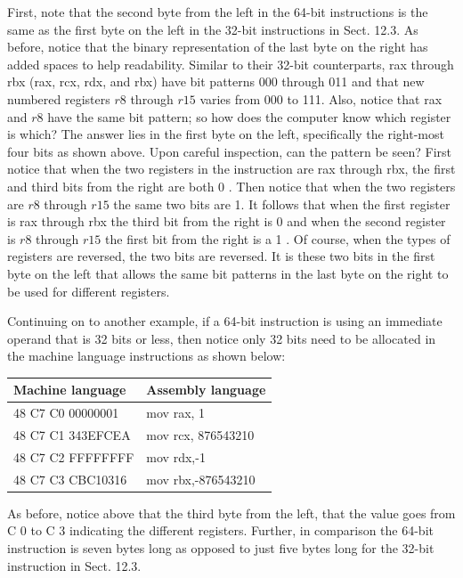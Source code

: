 \documentclass[10pt]{book}
\begin{document}
\begin{center}
\begin{center}
\begin{center}
\begin{center}
\begin{center}
First, note that the second byte from the left in the 64-bit instructions is the same as the first byte on the left in the 32-bit instructions in Sect. 12.3. As before, notice that the binary representation of the last byte on the right has added spaces to help readability. Similar to their 32-bit counterparts, rax through rbx (rax, rcx, rdx, and rbx) have bit patterns 000 through 011 and that new numbered registers $r 8$ through $r 15$ varies from 000 to 111. Also, notice that rax and $r 8$ have the same bit pattern; so how does the computer know which register is which? The answer lies in the first byte on the left, specifically the right-most four bits as shown above. Upon careful inspection, can the pattern be seen? First notice that when the two registers in the instruction are rax through rbx, the first and third bits from the right are both 0 . Then notice that when the two registers are $r 8$ through $r 15$ the same two bits are 1. It follows that when the first register is rax through rbx the third bit from the right is 0 and when the second register is $r 8$ through $r 15$ the first bit from the right is a 1 . Of course, when the types of registers are reversed, the two bits are reversed. It is these two bits in the first byte on the left that allows the same bit patterns in the last byte on the right to be used for different registers.

Continuing on to another example, if a 64-bit instruction is using an immediate operand that is 32 bits or less, then notice only 32 bits need to be allocated in the machine language instructions as shown below:

\begin{center}
\begin{tabular}{|l|l|}
\hline
Machine language & Assembly language \\
\hline
48 C7 C0 00000001 & mov rax, 1 \\
\hline
48 C7 C1 343EFCEA & mov rcx, 876543210 \\
\hline
48 C7 C2 FFFFFFFF & mov rdx,-1 \\
\hline
48 C7 C3 CBC10316 & mov rbx,-876543210 \\
\hline
\end{tabular}
\end{center}

As before, notice above that the third byte from the left, that the value goes from C 0 to C 3 indicating the different registers. Further, in comparison the 64-bit instruction is seven bytes long as opposed to just five bytes long for the 32-bit instruction in Sect. 12.3.



\end{center}
\end{center}
\end{center}
\end{center}
\end{center}
\end{document}
